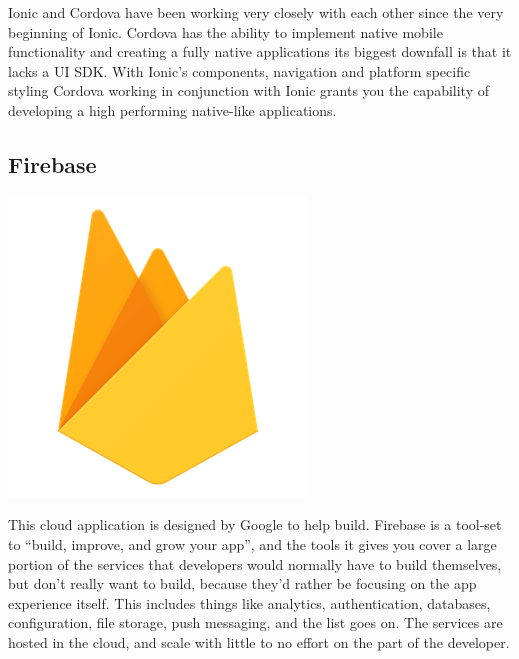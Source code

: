 \documentclass[a4paper,12pt]{report}
\begin{document}
Ionic and Cordova have been working very closely with each other since the very beginning of Ionic. Cordova has the ability to implement native mobile functionality and creating a fully native applications its biggest downfall is that it lacks a UI SDK.
With Ionic's components, navigation and platform specific styling Cordova working in conjunction with Ionic grants you the capability of developing a high performing native-like applications.\cite{cordovaInsight}

\subsection{Firebase} 
\includegraphics[scale=.05]{images/firebase.png}

This cloud application is designed by Google to help build. Firebase is a tool-set to “build, improve, and grow your app”, and the tools it gives you cover a large portion of the services that developers would normally have to build themselves, but don’t really want to build, because they’d rather be focusing on the app experience itself. This includes things like analytics, authentication, databases, configuration, file storage, push messaging, and the list goes on. The services are hosted in the cloud, and scale with little to no effort on the part of the developer.
\end{document}
